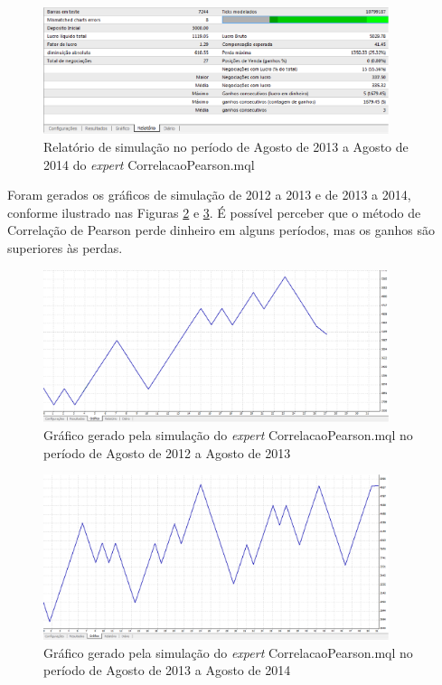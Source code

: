 \begin{figure}[H]
\centering

\includegraphics[width=0.9\textwidth]{figuras/protocoloCorrelacao2}
\caption{Relatório de simulação no período de Agosto de 2013 a Agosto de 2014 do \textit{expert} CorrelacaoPearson.mql}
\label{protocoloCorrelacao2}
\end{figure}

Foram gerados os gráficos de simulação de 2012 a 2013 e de 2013 a 2014, conforme ilustrado nas Figuras \ref{protocoloCorrelacao3} e \ref{protocoloCorrelacao4}. É possível perceber que o método de Correlação de Pearson perde dinheiro em alguns períodos, mas os ganhos são superiores às perdas.

\begin{figure}[H]
\centering
\includegraphics[width=0.9\textwidth]{figuras/protocoloCorrelacao3}
\caption{Gráfico gerado pela simulação do \textit{expert} CorrelacaoPearson.mql no período de Agosto de 2012 a Agosto de 2013}
\label{protocoloCorrelacao3}
\end{figure}

\begin{figure}[H]
\centering
\includegraphics[width=0.9\textwidth]{figuras/protocoloCorrelacao4}
\caption{Gráfico gerado pela simulação do \textit{expert} CorrelacaoPearson.mql no período de Agosto de 2013 a Agosto de 2014}
\label{protocoloCorrelacao4}
\end{figure}

